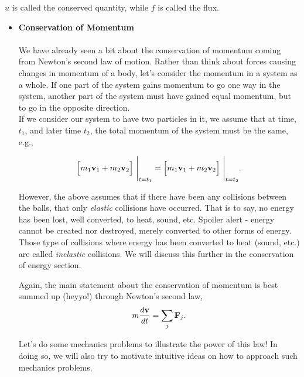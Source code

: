 $u$ is called the conserved quantity, while $f$ is called the flux.  

\begin{itemize}

%
% 
\item[] {\bf{Conservation of Momentum}} \\ \\

We have already seen a bit about the conservation of momentum coming from Newton's second law of motion. Rather than think about forces causing changes in momentum of a body, let's consider the momentum in a system as a whole. If one part of the system gains momentum to go one way in the system, another part of the system must have gained equal momentum, but to go in the opposite direction. \\

If we consider our system to have two particles in it, we assume that at time, $t_1$, and later time $t_2$, the total momentum of the system must be the same, e.g.,

$$\Big[ m_1 {\bf{v}}_1 + m_2 {\bf{v}}_2\Big]\ \Bigg|_{t=t_1} = \Big[ m_1 {\bf{v}}_1 + m_2 {\bf{v}}_2\Big] \ \Bigg|_{t=t_2}.$$ 

However, the above assumes that if there have been any collisions between the balls, that only \emph{elastic} collisions have occurred. That is to say, no energy has been lost, well converted, to heat, sound, etc. Spoiler alert - energy cannot be created nor destroyed, merely converted to other forms of energy. Those type of collisions where energy has been converted to heat (sound, etc.) are called \emph{inelastic} collisions. We will discuss this further in the conservation of energy section. 

Again, the main statement about the conservation of momentum is best summed up (heyyo!) through Newton's second law,
$$m \frac{d{\bf{v}}}{dt} = \sum_{j} {\bf{F}}_j.$$

Let's do some mechanics problems to illustrate the power of this law! In doing so, we will also try to motivate intuitive ideas on how to approach such mechanics problems.








\end{itemize}